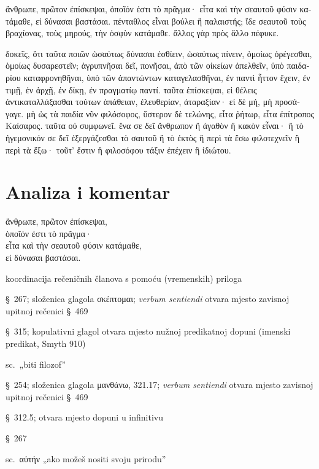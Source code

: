 {\large

\begin{greek}

\noindent ἄνθρωπε, πρῶτον ἐπίσκεψαι, ὁποῖόν ἐστι τὸ πρᾶγμα· εἶτα καὶ τὴν σεαυτοῦ φύσιν κατάμαθε, εἰ δύνασαι βαστάσαι. πένταθλος εἶναι βούλει ἢ παλαιστής; ἴδε σεαυτοῦ τοὺς βραχίονας, τοὺς μηρούς, τὴν ὀσφὺν κατάμαθε. ἄλλος γὰρ πρὸς ἄλλο πέφυκε. 

δοκεῖς, ὅτι ταῦτα ποιῶν ὡσαύτως δύνασαι ἐσθίειν, ὡσαύτως πίνειν, ὁμοίως ὀρέγεσθαι, ὁμοίως δυσαρεστεῖν; ἀγρυπνῆσαι δεῖ, πονῆσαι, ἀπὸ τῶν οἰκείων ἀπελθεῖν, ὑπὸ παιδαρίου καταφρονηθῆναι, ὑπὸ τῶν ἀπαντώντων καταγελασθῆναι, ἐν παντὶ ἧττον ἔχειν, ἐν τιμῇ, ἐν ἀρχῇ, ἐν δίκῃ, ἐν πραγματίῳ παντί. ταῦτα ἐπίσκεψαι, εἰ θέλεις ἀντικαταλλάξασθαι τούτων ἀπάθειαν, ἐλευθερίαν, ἀταραξίαν· εἰ δὲ μή, μὴ προσάγαγε. μὴ ὡς τὰ παιδία νῦν φιλόσοφος, ὕστερον δὲ τελώνης, εἶτα ῥήτωρ, εἶτα ἐπίτροπος Καίσαρος. ταῦτα οὐ συμφωνεῖ. ἕνα σε δεῖ ἄνθρωπον ἢ ἀγαθὸν ἢ κακὸν εἶναι· ἢ τὸ ἡγεμονικόν σε δεῖ ἐξεργάζεσθαι τὸ σαυτοῦ ἢ τὸ ἐκτὸς ἢ περὶ τὰ ἔσω φιλοτεχνεῖν ἢ περὶ τὰ ἔξω· τοῦτ' ἔστιν ἢ φιλοσόφου τάξιν ἐπέχειν ἢ ἰδιώτου.

\end{greek}

}


\section*{Analiza i komentar}


{\large
\begin{greek}
\noindent ἄνθρωπε, πρῶτον ἐπίσκεψαι, \\
\tabto{2em} ὁποῖόν ἐστι τὸ πρᾶγμα· \\
εἶτα καὶ τὴν σεαυτοῦ φύσιν κατάμαθε, \\
\tabto{2em} εἰ δύνασαι βαστάσαι.\\

\end{greek}
}

\begin{description}[noitemsep]
\item[πρῶτον\dots\ εἶτα\dots] koordinacija rečeničnih članova s pomoću (vremenskih) priloga
\item[ἐπίσκεψαι] §~267; složenica glagola σκέπτομαι; \textit{verbum sentiendi} otvara mjesto zavisnoj upitnoj rečenici §~469
\item[ὁποῖόν ἐστι] §~315; kopulativni glagol otvara mjesto nužnoj predikatnoj dopuni (imenski predikat, Smyth 910)
\item[τὸ πρᾶγμα] sc.\ „biti filozof”
\item[κατάμαθε] §~254; složenica glagola μανθάνω, 321.17; \textit{verbum sentiendi} otvara mjesto zavisnoj upitnoj rečenici §~469
\item[εἰ δύνασαι] §~312.5; otvara mjesto dopuni u infinitivu
\item[βαστάσαι] §~267
\item[εἰ δύνασαι βαστάσαι] sc.\ αὐτήν „ako možeš nositi svoju prirodu”
\end{description}

